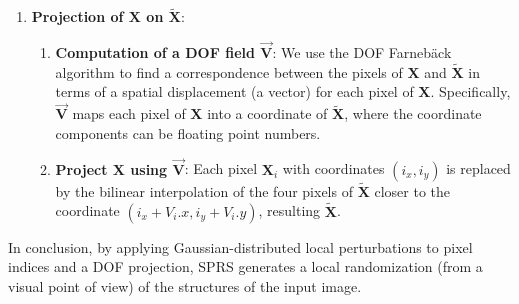 \begin{subappendices}
\begin{enumerate}
\item \textbf{Projection of $\mathbf{X}$ on $\tilde{\mathbf{X}}$}:
  \begin{enumerate}
  \item \textbf{Computation of a \gls{DOF} field
      $\overrightarrow{\mathbf{V}}$}: We use the \gls{DOF} Farneb\"ack
    algorithm \cite{farneback2003two} to find a correspondence between
    the pixels of $\mathbf{X}$ and $\tilde{\mathbf{X}}$ in terms of a
    spatial displacement (a vector) for each pixel of
    $\mathbf{X}$. Specifically, $\overrightarrow{\mathbf{V}}$ maps each
    pixel of $\mathbf{X}$ into a coordinate of $\tilde{\mathbf{X}}$,
    where the coordinate components can be floating point numbers.
  \item \textbf{Project $\mathbf{X}$ using
      $\overrightarrow{\mathbf{V}}$}: Each pixel $\mathbf{X}_i$
    with coordinates $(i_x, i_y)$ is replaced by the bilinear
    interpolation of the four pixels of $\tilde{\mathbf{X}}$ closer to
    the coordinate $(i_x+V_i.x,i_y+V_i.y)$, resulting
    $\tilde{\mathbf{X}}$.
  \end{enumerate}
\end{enumerate}

In conclusion, by applying Gaussian-distributed local perturbations to
pixel indices and a \gls{DOF} projection, \gls{SPRS} generates a local
randomization (from a visual point of view) of the structures of the
input image.

\end{subappendices}
